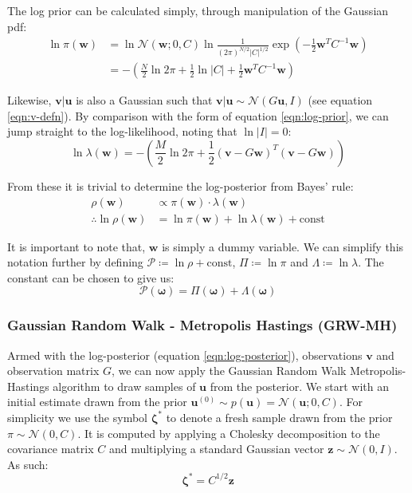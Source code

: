 \documentclass[]{article}
\newcommand{\Ncal}{\mathcal{N}}
\newcommand{\lik}{\lambda}
\newcommand{\loglik}{\Lambda}
\newcommand{\ubold}{\boldsymbol{u}}
\newcommand{\vbold}{\boldsymbol{v}}
\newcommand{\wbold}{\boldsymbol{w}}
\newcommand{\zbold}{\boldsymbol{z}}
\newcommand{\zetabold}{\boldsymbol{\zeta^*}}
\newcommand{\omegabold}{\boldsymbol{\omega}}
\newcommand{\Rho}{\mathcal{P}}
\begin{document}
The log prior can be calculated simply, through manipulation of the Gaussian pdf:
%
\begin{align}
	\ln \pi (\wbold) &= \ln \Ncal(\wbold; 0, C) \ln \frac{1}{(2\pi)^{N/2} |C|^{1/2}} \exp \left( - \frac{1}{2} \wbold^T C^{-1} \wbold \right) \nonumber \\
	&= - \left( \frac{N}{2} \ln 2\pi + \frac{1}{2} \ln |C| + \frac{1}{2} \wbold^T C^{-1} \wbold \right)
	\label{eqn:log-prior}
\end{align}

Likewise, $\vbold | \ubold$ is also a Gaussian such that $\vbold |\ubold \sim \Ncal(G\ubold, I)$ (see equation \ref{eqn:v-defn}). By comparison with the form of equation \ref{eqn:log-prior}, we can jump straight to the log-likelihood, noting that $\ln |I| = 0$:
%
\begin{equation}
	\ln \lik(\wbold) = - \left( \frac{M}{2} \ln 2 \pi + \frac{1}{2} \left(\vbold - G\wbold \right)^T \left(\vbold - G\wbold\right)\right)
	\label{eqn:log-likelihood}
\end{equation}

From these it is trivial to determine the log-posterior from Bayes' rule:
%
\begin{align}
	\rho(\wbold) &\propto \pi(\wbold) \cdot \lik(\wbold) \nonumber \\
	\therefore \ln \rho(\wbold) &= \ln \pi(\wbold) + \ln \lik(\wbold) + \textrm{const}
\end{align}

It is important to note that, $\wbold$ is simply a dummy variable. We can simplify this notation further by defining $\Rho \coloneqq \ln \rho + \textrm{const}$, $\Pi \coloneqq \ln \pi$ and $\loglik \coloneqq \ln \lik$. The constant can be chosen to give us:
%
\begin{equation}
	\Rho(\omegabold) = \Pi(\omegabold) + \loglik(\omegabold)
	\label{eqn:log-posterior}
\end{equation}

\subsubsection{Gaussian Random Walk - Metropolis Hastings (GRW-MH)}

Armed with the log-posterior (equation \ref{eqn:log-posterior}), observations $\vbold$ and observation matrix $G$, we can now apply the Gaussian Random Walk Metropolis-Hastings algorithm to draw samples of $\ubold$ from the posterior. We start with an initial estimate drawn from the prior $\ubold^{(0)} \sim p(\ubold) = \Ncal(\ubold; 0, C)$. For simplicity we use the symbol $\zetabold$ to denote a fresh sample drawn from the prior $\pi \sim \Ncal(0, C)$. It is computed by applying a Cholesky decomposition to the covariance matrix $C$ and multiplying a standard Gaussian vector $\zbold \sim \Ncal(0, I)$. As such:
%
\begin{equation}
	\zetabold = C^{1/2} \zbold
	\label{eqn:zeta}
\end{equation}
\end{document}
